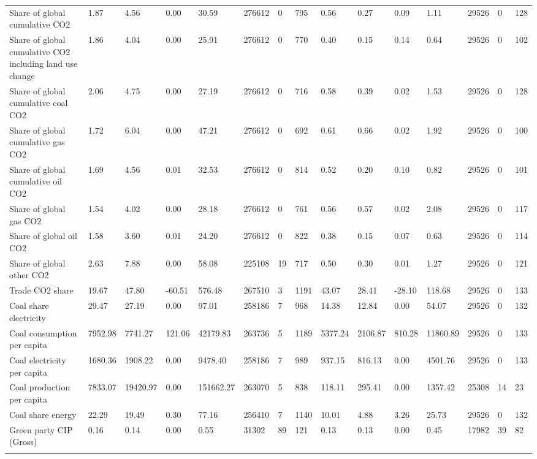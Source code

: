 \begin{longtable}{lllllllllllllll}
\addlinespace
Share of global cumulative CO2 & 1.87 & 4.56 & 0.00 & 30.59 & 276612 & 0 & 795 & 0.56 & 0.27 & 0.09 & 1.11 & 29526 & 0 & 128\\
Share of global cumulative CO2 including land use change & 1.86 & 4.04 & 0.00 & 25.91 & 276612 & 0 & 770 & 0.40 & 0.15 & 0.14 & 0.64 & 29526 & 0 & 102\\
Share of global cumulative coal CO2 & 2.06 & 4.75 & 0.00 & 27.19 & 276612 & 0 & 716 & 0.58 & 0.39 & 0.02 & 1.53 & 29526 & 0 & 128\\
Share of global cumulative gas CO2 & 1.72 & 6.04 & 0.00 & 47.21 & 276612 & 0 & 692 & 0.61 & 0.66 & 0.02 & 1.92 & 29526 & 0 & 100\\
Share of global cumulative oil CO2 & 1.69 & 4.56 & 0.01 & 32.53 & 276612 & 0 & 814 & 0.52 & 0.20 & 0.10 & 0.82 & 29526 & 0 & 101\\
\addlinespace
Share of global gas CO2 & 1.54 & 4.02 & 0.00 & 28.18 & 276612 & 0 & 761 & 0.56 & 0.57 & 0.02 & 2.08 & 29526 & 0 & 117\\
Share of global oil CO2 & 1.58 & 3.60 & 0.01 & 24.20 & 276612 & 0 & 822 & 0.38 & 0.15 & 0.07 & 0.63 & 29526 & 0 & 114\\
Share of global other CO2 & 2.63 & 7.88 & 0.00 & 58.08 & 225108 & 19 & 717 & 0.50 & 0.30 & 0.01 & 1.27 & 29526 & 0 & 121\\
Trade CO2 share & 19.67 & 47.80 & -60.51 & 576.48 & 267510 & 3 & 1191 & 43.07 & 28.41 & -28.10 & 118.68 & 29526 & 0 & 133\\
Coal share electricity & 29.47 & 27.19 & 0.00 & 97.01 & 258186 & 7 & 968 & 14.38 & 12.84 & 0.00 & 54.07 & 29526 & 0 & 132\\
\addlinespace
Coal consumption per capita & 7952.98 & 7741.27 & 121.06 & 42179.83 & 263736 & 5 & 1189 & 5377.24 & 2106.87 & 810.28 & 11860.89 & 29526 & 0 & 133\\
Coal electricity per capita & 1680.36 & 1908.22 & 0.00 & 9478.40 & 258186 & 7 & 989 & 937.15 & 816.13 & 0.00 & 4501.76 & 29526 & 0 & 133\\
Coal production per capita & 7833.07 & 19420.97 & 0.00 & 151662.27 & 263070 & 5 & 838 & 118.11 & 295.41 & 0.00 & 1357.42 & 25308 & 14 & 23\\
Coal share energy & 22.29 & 19.49 & 0.30 & 77.16 & 256410 & 7 & 1140 & 10.01 & 4.88 & 3.26 & 25.73 & 29526 & 0 & 132\\
Green party CIP (Gross) & 0.16 & 0.14 & 0.00 & 0.55 & 31302 & 89 & 121 & 0.13 & 0.13 & 0.00 & 0.45 & 17982 & 39 & 82\\
\addlinespace

\end{longtable}
